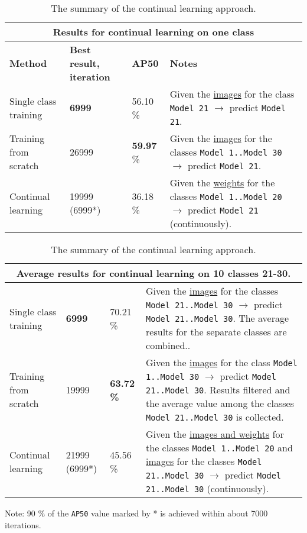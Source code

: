\begin{table}
\centering
\caption{The summary of the continual learning approach.}\label{summary_table_2} 
\begin{tabularx}{\textwidth}{|p{1.5cm}|p{1.5cm}|p{1.5cm}|X|} 
 \hline
\multicolumn{4}{c}{\textbf{Results for continual learning on one class}} \\ \hline
\textbf{Method} & \textbf{Best result, iteration} & \textbf{AP50} & \textbf{Notes} \\
\hline
Single class training & \textbf{6999} & 56.10 \% & \multicolumn{1}{m{9cm}|}{Given the \uline{images} for the class \texttt{Model 21} $\rightarrow$ predict \texttt{Model 21}.} \\ 
\hline
Training from scratch  & 26999 & \textbf{59.97} \% & \multicolumn{1}{m{9cm}|}{Given the \uline{images} for the classes \texttt{Model 1..Model 30} $\rightarrow$ predict \texttt{Model 21}.} \\ 
\hline
Continual learning & 19999 (6999*) & 36.18 \% & \multicolumn{1}{m{9cm}|}{Given the \uline{weights} for the classes  \texttt{Model 1..Model 20} $\rightarrow$ predict \texttt{Model 21} (continuously).} \\ 
\hline  
\end{tabularx} 
\begin{tabularx}{\textwidth}{|p{1.5cm}|p{1.5cm}|p{1.5cm}|X|} 
\multicolumn{4}{c}{\textbf{Average results for continual learning on 10 classes 21-30}.} \\ 
\hline
Single class training  & \textbf{6999} & 70.21 \% & \multicolumn{1}{m{9cm}|}{Given the \uline{images} for the classes \texttt{Model 21..Model 30} $\rightarrow$ predict \texttt{Model 21..Model 30}. The average results for the  separate classes are combined..} \\ 
\hline
Training from scratch & 19999 & \textbf{63.72 \%} & \multicolumn{1}{m{9cm}|}{Given the \uline{images} for the class \texttt{Model 1..Model 30} $\rightarrow$ predict \texttt{Model 21..Model 30}. Results filtered and the average value among the classes \texttt{Model 21..Model 30} is collected.} \\ 
\hline
Continual learning & 21999 (6999*) & 45.56 \% & \multicolumn{1}{m{9cm}|}{Given the \uline{images and weights} for the classes \texttt{Model 1..Model 20} and \uline{images} for the classes \texttt{Model 21..Model 30} $\rightarrow$ predict \texttt{Model 21..Model 30} (continuously). } \\ 
\hline      
\end{tabularx}
\begin{tablenotes}
\small
\item Note: 90 \% of the \texttt{AP50} value marked by * is achieved within about 7000 iterations.
\end{tablenotes}
\end{table}

